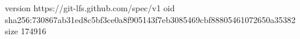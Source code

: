 version https://git-lfs.github.com/spec/v1
oid sha256:730867ab31ed8c5bf3ce0a8f905143f7eb3085469cbf88805461072650a35382
size 174916
